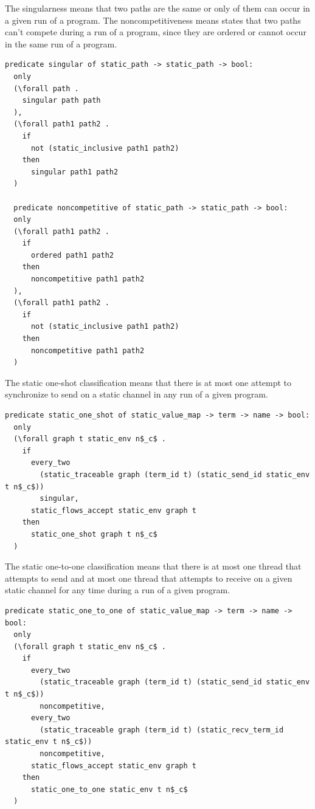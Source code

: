 \documentclass[10pt]{article}
\begin{document}
The singularness means that two paths are the same or only of them can occur in a given run of
a program. The noncompetitiveness means states that two paths can't compete during a run of a
program, since they are ordered or cannot occur in the same run of a program.

\begin{lstlisting}[language=logic, mathescape]
  predicate singular of static_path -> static_path -> bool:
  only
  (\forall path .
    singular path path
  ),
  (\forall path1 path2 .
    if
      not (static_inclusive path1 path2)
    then
      singular path1 path2
  )

  predicate noncompetitive of static_path -> static_path -> bool:
  only
  (\forall path1 path2 .
    if
      ordered path1 path2
    then
      noncompetitive path1 path2
  ),
  (\forall path1 path2 .
    if
      not (static_inclusive path1 path2)
    then
      noncompetitive path1 path2
  )
\end{lstlisting}


The static one-shot classification means that there is at most one attempt
to synchronize to send on a static channel in any run of a given program.

\begin{lstlisting}[language=logic, mathescape]
  predicate static_one_shot of static_value_map -> term -> name -> bool:
  only
  (\forall graph t static_env n$_c$ .
    if
      every_two
        (static_traceable graph (term_id t) (static_send_id static_env t n$_c$))
        singular,
      static_flows_accept static_env graph t
    then
      static_one_shot graph t n$_c$
  )
\end{lstlisting}

The static one-to-one classification means that there is at most one thread that attempts to
send and at most one thread that attempts to receive on a given static channel for any time
during a run of a given program.

\begin{lstlisting}[language=logic, mathescape]
  predicate static_one_to_one of static_value_map -> term -> name -> bool:
  only
  (\forall graph t static_env n$_c$ .
    if
      every_two
        (static_traceable graph (term_id t) (static_send_id static_env t n$_c$))
        noncompetitive, 
      every_two
        (static_traceable graph (term_id t) (static_recv_term_id static_env t n$_c$))
        noncompetitive, 
      static_flows_accept static_env graph t 
    then
      static_one_to_one static_env t n$_c$
  )
\end{lstlisting}
\end{document}
